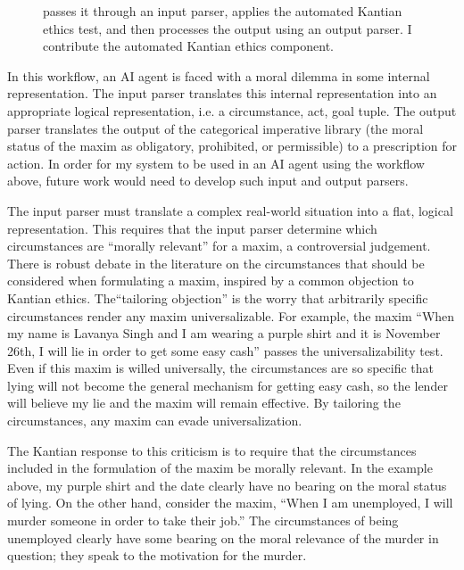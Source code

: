 \begin{isabellebody}
\begin{figure}
{passes it through an input parser, applies the automated Kantian ethics test, and then processes the 
output using an output parser. I contribute the automated Kantian ethics component.} \label{fig:AIengine}
\end{figure}
%
\begin{isamarkuptext}%
In this workflow, an AI agent is faced with a moral dilemma in some internal representation. The input
parser translates this internal representation into an appropriate logical representation, i.e. 
a circumstance, act, goal tuple. The output parser translates the output of the categorical imperative
library (the moral status of the maxim as obligatory, prohibited, or permissible) to a prescription for
action. In order for my system to be used in an AI agent using the workflow
above, future work would need to develop such input and output parsers.

The input parser must translate a complex real-world situation into a flat, logical representation.
This requires that the input parser determine which circumstances are ``morally relevant''
for a maxim, a controversial judgement.
There is robust debate in the literature on the circumstances that should be considered when formulating a maxim, 
inspired by a common objection to Kantian ethics. The``tailoring objection'' is the worry that arbitrarily specific 
circumstances render any maxim universalizable. For example, the maxim ``When my name is Lavanya Singh 
and I am wearing a purple shirt and it is November 26th, I will lie in order to get some easy cash'' 
passes the universalizability test. Even if this maxim is willed universally, the circumstances are so 
specific that lying will not become the general mechanism for getting easy cash, so the lender will 
believe my lie and the maxim will remain effective. By tailoring the circumstances, any maxim can 
evade universalization.

The Kantian response to this criticism is to require that the circumstances included in the formulation
of the maxim be morally relevant. In the example above, my purple shirt and the date clearly have no bearing on 
the moral status of lying. On the other hand, consider the maxim, ``When I am unemployed, I will murder
someone in order to take their job.'' The circumstances of being unemployed clearly have some bearing on the moral
relevance of the murder in question; they speak to the motivation for the murder. 


\end{isamarkuptext}
\end{isabellebody}
